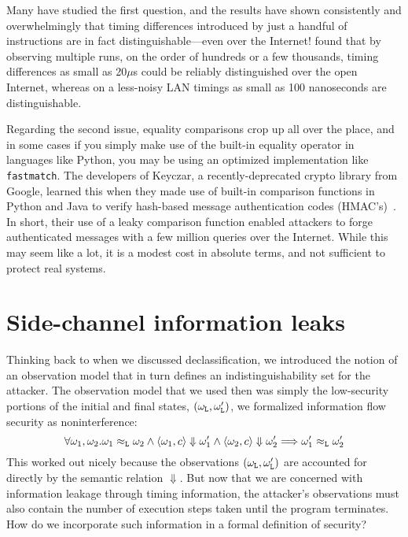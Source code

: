 \documentclass[11pt,twoside]{scrartcl}
\begin{document}
Many have studied the first question, and the results have shown consistently and overwhelmingly that timing differences introduced by just a handful of instructions are in fact distinguishable---even over the Internet!
\citeauthor{crosby09} found that by observing multiple runs, on the order of hundreds or a few thousands, timing differences as small as 20$\mu$s could be reliably distinguished over the open Internet, whereas on a less-noisy LAN timings as small as 100 nanoseconds are distinguishable.

Regarding the second issue, equality comparisons crop up all over the place, and in some cases if you simply make use of the built-in  equality operator in languages like Python, you may be using an optimized implementation like \verb'fastmatch'.
The developers of Keyczar, a recently-deprecated crypto library from Google, learned this when they made use of built-in comparison functions in Python and Java to verify hash-based message authentication codes (HMAC's)~\citet*{lawson09}.
In short, their use of a leaky comparison function enabled attackers to forge authenticated messages with a few million queries over the Internet.
While this may seem like a lot, it is a modest cost in absolute terms, and not sufficient to protect real systems.

\section{Side-channel information leaks}

Thinking back to when we discussed declassification, we introduced the notion of an observation model that in turn defines an indistinguishability set for the attacker. The observation model that we used then was simply the low-security portions of the initial and final states, $(\omega_{\texttt{\upshape L}}, \omega'_{\texttt{\upshape L}})$, we formalized information flow security as noninterference:
\begin{equation}
\label{eq:nonint}
\forall \omega_1,\omega_2 . \omega_1 \approx_\lowt \omega_2 \land \langle \omega_1, c\rangle \Downarrow \omega_1' \land \langle\omega_2, c\rangle\Downarrow\omega_2' \Longrightarrow \omega_1' \approx_\lowt \omega_2'
\end{equation}
This worked out nicely because the observations $(\omega_{\texttt{\upshape L}}, \omega'_{\texttt{\upshape L}})$ are accounted for directly by the semantic relation $\Downarrow$. But now that we are concerned with information leakage through timing information, the attacker's observations must also contain the number of execution steps taken until the program terminates. How do we incorporate such information in a formal definition of security?
\end{document}
